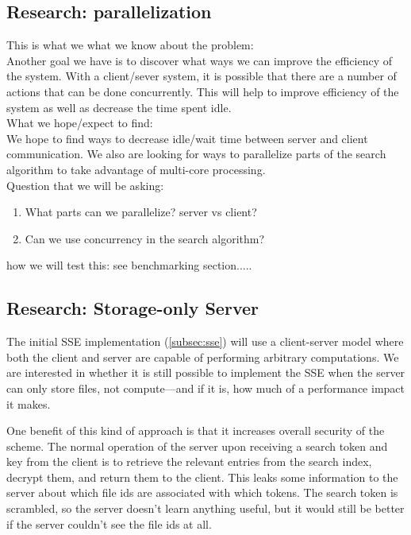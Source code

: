 \documentclass[onecolumn, draftclsnofoot,10pt, compsoc]{IEEEtran}
\begin{document}
\subsection{ Research: parallelization }
\label{subsec:parallel}

This is what we what we know about the problem: \\
Another goal we have is to discover what ways we can improve the efficiency of the system. With a client/sever system, it is possible that there are a number of actions that can be done concurrently. This will help to improve efficiency of the system as well as decrease the time spent idle. \\

What we hope/expect to find: \\
We hope to find ways to decrease idle/wait time between server and client communication. We also are looking for ways to parallelize parts of the search algorithm to take advantage of multi-core processing.  \\

Question that we will be asking:
\begin{enumerate}
\item What parts can we parallelize? server vs client?
\item Can we use concurrency in the search algorithm?
\end{enumerate}


how we will test this: see benchmarking section.....


\subsection{ Research: Storage-only Server }
\label{subsec:dumbserver}


The initial SSE implementation (\ref{subsec:sse}) will use a client-server model where both the client and server are capable of performing arbitrary computations.
We are interested in whether it is still possible to implement the SSE when the server can only store files, not compute---and if it is, how much of a performance impact it makes.

One benefit of this kind of approach is that it increases overall security of the scheme. The normal operation of the server upon receiving a search token and key from the client is to retrieve the relevant entries from the search index, decrypt them, and return them to the client. This leaks some information to the server about which file ids are associated with which tokens. The search token is scrambled, so the server doesn't learn anything useful, but it would still be better if the server couldn't see the file ids at all.
\end{document}
